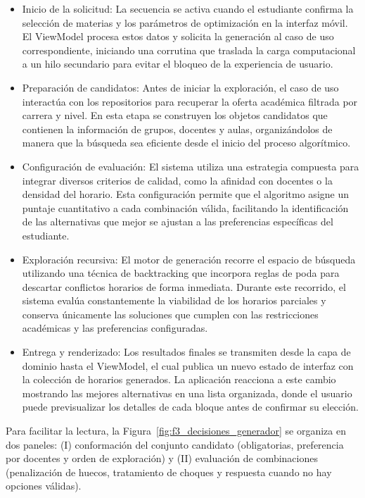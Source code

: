 \begin{itemize}
    \item Inicio de la solicitud: La secuencia se activa cuando el estudiante confirma la selección de materias y los parámetros de optimización en la interfaz móvil. El ViewModel procesa estos datos y solicita la generación al caso de uso correspondiente, iniciando una corrutina que traslada la carga computacional a un hilo secundario para evitar el bloqueo de la experiencia de usuario.
    \item Preparación de candidatos: Antes de iniciar la exploración, el caso de uso interactúa con los repositorios para recuperar la oferta académica filtrada por carrera y nivel. En esta etapa se construyen los objetos candidatos que contienen la información de grupos, docentes y aulas, organizándolos de manera que la búsqueda sea eficiente desde el inicio del proceso algorítmico.
    \item Configuración de evaluación: El sistema utiliza una estrategia compuesta para integrar diversos criterios de calidad, como la afinidad con docentes o la densidad del horario. Esta configuración permite que el algoritmo asigne un puntaje cuantitativo a cada combinación válida, facilitando la identificación de las alternativas que mejor se ajustan a las preferencias específicas del estudiante.
    \item Exploración recursiva: El motor de generación recorre el espacio de búsqueda utilizando una técnica de backtracking que incorpora reglas de poda para descartar conflictos horarios de forma inmediata. Durante este recorrido, el sistema evalúa constantemente la viabilidad de los horarios parciales y conserva únicamente las soluciones que cumplen con las restricciones académicas y las preferencias configuradas.
    \item Entrega y renderizado: Los resultados finales se transmiten desde la capa de dominio hasta el ViewModel, el cual publica un nuevo estado de interfaz con la colección de horarios generados. La aplicación reacciona a este cambio mostrando las mejores alternativas en una lista organizada, donde el usuario puede previsualizar los detalles de cada bloque antes de confirmar su elección.
\end{itemize}

\noindent Para facilitar la lectura, la Figura~\ref{fig:f3_decisiones_generador} se organiza en dos paneles: (I) conformación del conjunto candidato (obligatorias, preferencia por docentes y orden de exploración) y (II) evaluación de combinaciones (penalización de huecos, tratamiento de choques y respuesta cuando no hay opciones válidas).

